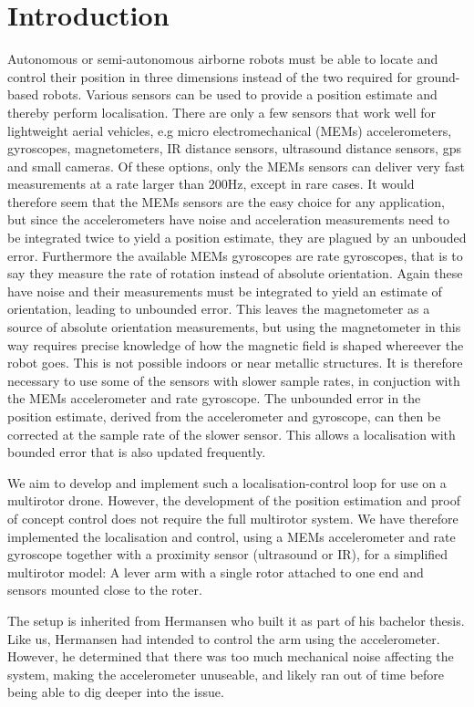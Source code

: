 \section{Introduction}
Autonomous or semi-autonomous airborne robots must be able to locate and control their position in three dimensions instead of
the two required for ground-based robots. Various sensors can be used to provide a position estimate and thereby perform localisation.
There are only a few sensors that work well for lightweight aerial vehicles, e.g micro electromechanical (MEMs) accelerometers, 
gyroscopes, magnetometers, IR distance sensors, ultrasound distance sensors, gps and small cameras. Of these options, only the MEMs
sensors can deliver very fast measurements at a rate larger than 200Hz, except in rare cases. It would therefore seem that the MEMs
sensors are the easy choice for any application, but since the accelerometers have noise and acceleration measurements need to be 
integrated twice to yield a position estimate, they are plagued by an unbouded error. Furthermore the available MEMs gyroscopes are rate 
gyroscopes, that is to say they measure the rate of rotation instead of absolute orientation. Again these have noise and their measurements
must be integrated to yield an estimate of orientation, leading to unbounded error. This leaves the magnetometer as a source of
absolute orientation measurements, but using the magnetometer in this way requires precise knowledge of how the magnetic field is 
shaped whereever the robot goes. This is not possible indoors or near metallic structures.
It is therefore necessary to use some of the sensors with slower sample rates, in conjuction with
the MEMs accelerometer and rate gyroscope. The unbounded error in the position estimate, derived from the accelerometer and gyroscope,
can then be corrected at the sample rate of the slower sensor. This allows a localisation with bounded error that is also updated
frequently. 

We aim to develop and implement such a localisation-control loop for use on a multirotor drone. However, the development of the position 
estimation and proof of concept control does not require the full multirotor system. We have therefore implemented the localisation 
and control, using a MEMs accelerometer and rate gyroscope together with a proximity sensor (ultrasound or IR), for a simplified multirotor model: 
A lever arm with a single rotor attached to one end and sensors mounted close to the roter.

The setup is inherited from Hermansen who built it as part of his bachelor thesis\cite{Hermansen2013a}.
Like us, Hermansen had intended to control the arm using the accelerometer. However, he determined that there was too much mechanical 
noise affecting the system, making the accelerometer unuseable, and likely ran out of time before being able to dig deeper into the 
issue.

